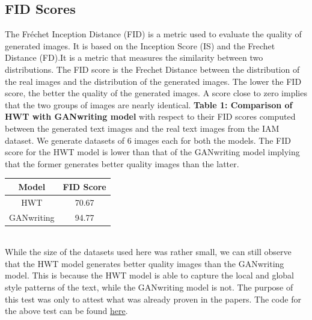 \documentclass[10pt,twocolumn,letterpaper]{article}
\begin{document}
\subsection{FID Scores}
The Fréchet Inception Distance (FID) is a metric used to evaluate the quality of generated images. It is based on the Inception Score (IS) and the Frechet Distance (FD).It is a metric that measures the similarity between two distributions. The FID score is the Frechet Distance between the distribution of the real images and the distribution of the generated images. The lower the FID score, the better the quality of the generated images. A score close to zero implies that the two groups of images are nearly identical. \newline
\newline
\textbf{Table 1: Comparison of HWT\cite{HWT} with GANwriting\cite{GAN-1} model}
 with respect to their FID scores computed between the generated text images and the real text images from the IAM dataset. We generate datasets of 6 images each for both the models. The FID score for the HWT model is lower than that of the GANwriting model implying that the former generates better quality images than the latter.
\begin{table}[h]
  \begin{center}
    \begin{tabular}{|c|c|}
      \hline
      \textbf{Model} & \textbf{FID Score} \\
      \hline
      HWT & 70.67 \\
      \hline
      GANwriting & 94.77 \\
      \hline
    \end{tabular}
  \end{center}
\end{table}\\
While the size of the datasets used here was rather small, we can still observe that the HWT model generates better quality images than the GANwriting model. This is because the HWT model is able to capture the local and global style patterns of the text, while the GANwriting model is not. The purpose of this test was only to attest what was already proven in the papers. The code for the above test can be found \href{https://github.com/Shambu-K/handwriting-generator-model/blob/main/Comparison%20of%20models/compare_fid.ipynb}{here}.
\newline
\end{document}
